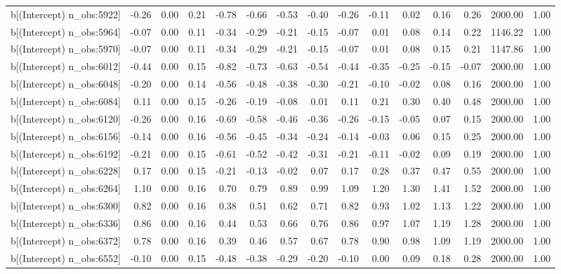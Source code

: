 \begin{table}[ht]
\begin{tabular}{rrrrrrrrrrrrrrr}
  b[(Intercept) n\_obs:5922] & -0.26 & 0.00 & 0.21 & -0.78 & -0.66 & -0.53 & -0.40 & -0.26 & -0.11 & 0.02 & 0.16 & 0.26 & 2000.00 & 1.00 \\ 
  b[(Intercept) n\_obs:5964] & -0.07 & 0.00 & 0.11 & -0.34 & -0.29 & -0.21 & -0.15 & -0.07 & 0.01 & 0.08 & 0.14 & 0.22 & 1146.22 & 1.00 \\ 
  b[(Intercept) n\_obs:5970] & -0.07 & 0.00 & 0.11 & -0.34 & -0.29 & -0.21 & -0.15 & -0.07 & 0.01 & 0.08 & 0.15 & 0.21 & 1147.86 & 1.00 \\ 
  b[(Intercept) n\_obs:6012] & -0.44 & 0.00 & 0.15 & -0.82 & -0.73 & -0.63 & -0.54 & -0.44 & -0.35 & -0.25 & -0.15 & -0.07 & 2000.00 & 1.00 \\ 
  b[(Intercept) n\_obs:6048] & -0.20 & 0.00 & 0.14 & -0.56 & -0.48 & -0.38 & -0.30 & -0.21 & -0.10 & -0.02 & 0.08 & 0.16 & 2000.00 & 1.00 \\ 
  b[(Intercept) n\_obs:6084] & 0.11 & 0.00 & 0.15 & -0.26 & -0.19 & -0.08 & 0.01 & 0.11 & 0.21 & 0.30 & 0.40 & 0.48 & 2000.00 & 1.00 \\ 
  b[(Intercept) n\_obs:6120] & -0.26 & 0.00 & 0.16 & -0.69 & -0.58 & -0.46 & -0.36 & -0.26 & -0.15 & -0.05 & 0.07 & 0.15 & 2000.00 & 1.00 \\ 
  b[(Intercept) n\_obs:6156] & -0.14 & 0.00 & 0.16 & -0.56 & -0.45 & -0.34 & -0.24 & -0.14 & -0.03 & 0.06 & 0.15 & 0.25 & 2000.00 & 1.00 \\ 
  b[(Intercept) n\_obs:6192] & -0.21 & 0.00 & 0.15 & -0.61 & -0.52 & -0.42 & -0.31 & -0.21 & -0.11 & -0.02 & 0.09 & 0.19 & 2000.00 & 1.00 \\ 
  b[(Intercept) n\_obs:6228] & 0.17 & 0.00 & 0.15 & -0.21 & -0.13 & -0.02 & 0.07 & 0.17 & 0.28 & 0.37 & 0.47 & 0.55 & 2000.00 & 1.00 \\ 
  b[(Intercept) n\_obs:6264] & 1.10 & 0.00 & 0.16 & 0.70 & 0.79 & 0.89 & 0.99 & 1.09 & 1.20 & 1.30 & 1.41 & 1.52 & 2000.00 & 1.00 \\ 
  b[(Intercept) n\_obs:6300] & 0.82 & 0.00 & 0.16 & 0.38 & 0.51 & 0.62 & 0.71 & 0.82 & 0.93 & 1.02 & 1.13 & 1.22 & 2000.00 & 1.00 \\ 
  b[(Intercept) n\_obs:6336] & 0.86 & 0.00 & 0.16 & 0.44 & 0.53 & 0.66 & 0.76 & 0.86 & 0.97 & 1.07 & 1.19 & 1.28 & 2000.00 & 1.00 \\ 
  b[(Intercept) n\_obs:6372] & 0.78 & 0.00 & 0.16 & 0.39 & 0.46 & 0.57 & 0.67 & 0.78 & 0.90 & 0.98 & 1.09 & 1.19 & 2000.00 & 1.00 \\ 
  b[(Intercept) n\_obs:6552] & -0.10 & 0.00 & 0.15 & -0.48 & -0.38 & -0.29 & -0.20 & -0.10 & 0.00 & 0.09 & 0.18 & 0.28 & 2000.00 & 1.00 \\ 

\end{tabular}
\end{table}
